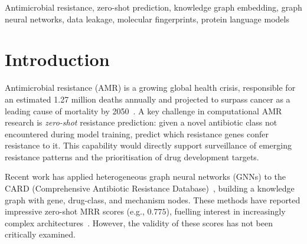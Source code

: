 \documentclass[conference]{IEEEtran}
\begin{document}
\begin{IEEEkeywords}
Antimicrobial resistance, zero-shot prediction, knowledge graph embedding, graph neural networks, data leakage, molecular fingerprints, protein language models
\end{IEEEkeywords}

\section{Introduction}
\label{sec:intro}

Antimicrobial resistance (AMR) is a growing global health crisis, responsible
for an estimated 1.27 million deaths annually and projected to surpass cancer
as a leading cause of mortality by 2050~\cite{murray2022global}. A key
challenge in computational AMR research is \emph{zero-shot} resistance
prediction: given a novel antibiotic class not encountered during model
training, predict which resistance genes confer resistance to it. This
capability would directly support surveillance of emerging resistance patterns
and the prioritisation of drug development targets.

Recent work has applied heterogeneous graph neural networks (GNNs) to the
CARD (Comprehensive Antibiotic Resistance Database)~\cite{alcock2023card},
building a knowledge graph with gene, drug-class, and mechanism nodes. These
methods have reported impressive zero-shot MRR scores (e.g., $0.775$), fuelling
interest in increasingly complex architectures~\cite{prior_work}. However, the
validity of these scores has not been critically examined.
\end{document}
